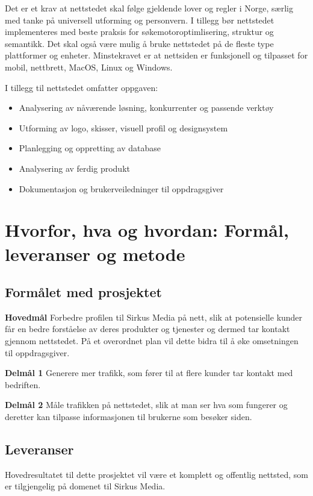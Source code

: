 Det er et krav at nettstedet skal følge gjeldende lover og regler i Norge, særlig med tanke på universell utforming og personvern. I tillegg bør nettstedet implementeres med beste praksis for søkemotoroptimlisering, struktur og semantikk. Det skal også være mulig å bruke nettstedet på de fleste type plattformer og enheter. Minstekravet er at nettsiden er funksjonell og tilpasset for mobil, nettbrett, MacOS, Linux og Windows.

I tillegg til nettstedet omfatter oppgaven: 
\begin{itemize}
\item Analysering av nåværende løsning, konkurrenter og passende verktøy
\item Utforming av logo, skisser, visuell profil og designsystem
\item Planlegging og oppretting av database
\item Analysering av ferdig produkt
\item Dokumentasjon og brukerveiledninger til oppdragsgiver
\end{itemize}

\section{Hvorfor, hva og hvordan: Formål, leveranser og metode}
\label{sec:maal-metode-resultater}
\subsection{Formålet med prosjektet}
\label{sec:maal}
\begin{compactitem}
\item [{\bf Hovedmål}] Forbedre profilen til Sirkus Media på nett, slik at potensielle kunder får en bedre forståelse av deres produkter og tjenester og dermed tar kontakt gjennom nettstedet. På et overordnet plan vil dette bidra til å øke omsetningen til oppdragsgiver.
\begin{compactitem}
\item [{\bf  Delmål 1} ] Generere mer trafikk, som fører til at flere kunder tar kontakt med bedriften. 
\item [{\bf  Delmål 2} ] Måle trafikken på nettstedet, slik at man ser hva som fungerer og deretter kan tilpasse informasjonen til brukerne som besøker siden.
\end{compactitem}
\end{compactitem}

\subsection{Leveranser}
\label{sec:resultater}
Hovedresultatet til dette prosjektet vil være et komplett og offentlig nettsted, som er tilgjengelig på domenet til Sirkus Media.

